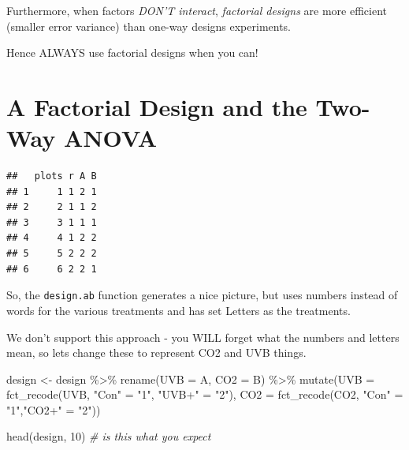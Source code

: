 \documentclass[
]{book}
\newenvironment{Shaded}{\begin{snugshade}}{\end{snugshade}}
\newcommand{\AttributeTok}[1]{\textcolor[rgb]{0.77,0.63,0.00}{#1}}
\newcommand{\CommentTok}[1]{\textcolor[rgb]{0.56,0.35,0.01}{\textit{#1}}}
\newcommand{\DecValTok}[1]{\textcolor[rgb]{0.00,0.00,0.81}{#1}}
\newcommand{\FunctionTok}[1]{\textcolor[rgb]{0.00,0.00,0.00}{#1}}
\newcommand{\NormalTok}[1]{#1}
\newcommand{\OtherTok}[1]{\textcolor[rgb]{0.56,0.35,0.01}{#1}}
\newcommand{\SpecialCharTok}[1]{\textcolor[rgb]{0.00,0.00,0.00}{#1}}
\newcommand{\StringTok}[1]{\textcolor[rgb]{0.31,0.60,0.02}{#1}}
\begin{document}
Furthermore, when factors \emph{DON'T interact}, \emph{factorial designs} are more efficient (smaller error variance) than one-way designs experiments.

Hence ALWAYS use factorial designs when you can!

\hypertarget{a-factorial-design-and-the-two-way-anova}{%
\section{A Factorial Design and the Two-Way ANOVA}\label{a-factorial-design-and-the-two-way-anova}}

\begin{Shaded}
\end{Shaded}

\begin{verbatim}
##   plots r A B
## 1     1 1 2 1
## 2     2 1 1 2
## 3     3 1 1 1
## 4     4 1 2 2
## 5     5 2 2 2
## 6     6 2 2 1
\end{verbatim}

So, the \texttt{design.ab} function generates a nice picture, but uses numbers instead of words for the various treatments and has set Letters as the treatments.

We don't support this approach - you WILL forget what the numbers and letters mean, so lets change these to represent CO2 and UVB things.

\begin{Shaded}
\begin{Highlighting}[]
\NormalTok{design }\OtherTok{\textless{}{-}}\NormalTok{ design }\SpecialCharTok{\%\textgreater{}\%}
  \FunctionTok{rename}\NormalTok{(}\AttributeTok{UVB =}\NormalTok{ A, }\AttributeTok{CO2 =}\NormalTok{ B) }\SpecialCharTok{\%\textgreater{}\%} 
  \FunctionTok{mutate}\NormalTok{(}\AttributeTok{UVB =} \FunctionTok{fct\_recode}\NormalTok{(UVB, }\StringTok{"Con"} \OtherTok{=} \StringTok{"1"}\NormalTok{, }\StringTok{"UVB+"} \OtherTok{=} \StringTok{"2"}\NormalTok{),}
         \AttributeTok{CO2 =} \FunctionTok{fct\_recode}\NormalTok{(CO2, }\StringTok{"Con"} \OtherTok{=} \StringTok{"1"}\NormalTok{,}\StringTok{"CO2+"} \OtherTok{=} \StringTok{"2"}\NormalTok{))}

\FunctionTok{head}\NormalTok{(design, }\DecValTok{10}\NormalTok{) }\CommentTok{\# is this what you expect}
\end{Highlighting}
\end{Shaded}
\end{document}
